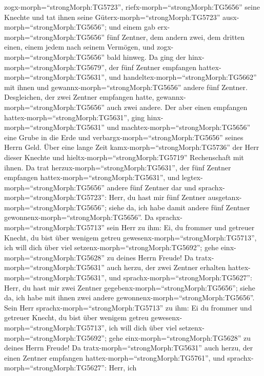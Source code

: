 zogx-morph=``strongMorph:TG5723'', riefx-morph=``strongMorph:TG5656''
seine Knechte und tat ihnen seine Güterx-morph=``strongMorph:TG5723''
ausx-morph=``strongMorph:TG5656'';  und einem gab
erx-morph=``strongMorph:TG5656'' fünf Zentner, dem andern zwei, dem
dritten einen, einem jedem nach seinem Vermögen, und
zogx-morph=``strongMorph:TG5656'' bald hinweg.  Da ging der
hinx-morph=``strongMorph:TG5679'', der fünf Zentner empfangen
hattex-morph=``strongMorph:TG5631'', und
handeltex-morph=``strongMorph:TG5662'' mit ihnen und
gewannx-morph=``strongMorph:TG5656'' andere fünf Zentner. 
Desgleichen, der zwei Zentner empfangen hatte,
gewannx-morph=``strongMorph:TG5656'' auch zwei andere.  Der
aber einen empfangen hattex-morph=``strongMorph:TG5631'', ging
hinx-morph=``strongMorph:TG5631'' und
machtex-morph=``strongMorph:TG5656'' eine Grube in die Erde und
verbargx-morph=``strongMorph:TG5656'' seines Herrn Geld. 
Über eine lange Zeit kamx-morph=``strongMorph:TG5736'' der Herr dieser
Knechte und hieltx-morph=``strongMorph:TG5719'' Rechenschaft mit ihnen.
 Da trat herzux-morph=``strongMorph:TG5631'', der fünf
Zentner empfangen hattex-morph=``strongMorph:TG5631'', und
legtex-morph=``strongMorph:TG5656'' andere fünf Zentner dar und
sprachx-morph=``strongMorph:TG5723'': Herr, du hast mir fünf Zentner
ausgetanx-morph=``strongMorph:TG5656''; siehe da, ich habe damit andere
fünf Zentner gewonnenx-morph=``strongMorph:TG5656''.  Da
sprachx-morph=``strongMorph:TG5713'' sein Herr zu ihm: Ei, du frommer
und getreuer Knecht, du bist über wenigem getreu
gewesenx-morph=``strongMorph:TG5713'', ich will dich über viel
setzenx-morph=``strongMorph:TG5692''; gehe
einx-morph=``strongMorph:TG5628'' zu deines Herrn Freude! 
Da tratx-morph=``strongMorph:TG5631'' auch herzu, der zwei Zentner
erhalten hattex-morph=``strongMorph:TG5631'', und
sprachx-morph=``strongMorph:TG5627'': Herr, du hast mir zwei Zentner
gegebenx-morph=``strongMorph:TG5656''; siehe da, ich habe mit ihnen zwei
andere gewonnenx-morph=``strongMorph:TG5656''.  Sein Herr
sprachx-morph=``strongMorph:TG5713'' zu ihm: Ei du frommer und getreuer
Knecht, du bist über wenigem getreu
gewesenx-morph=``strongMorph:TG5713'', ich will dich über viel
setzenx-morph=``strongMorph:TG5692''; gehe
einx-morph=``strongMorph:TG5628'' zu deines Herrn Freude! 
Da tratx-morph=``strongMorph:TG5631'' auch herzu, der einen Zentner
empfangen hattex-morph=``strongMorph:TG5761'', und
sprachx-morph=``strongMorph:TG5627'': Herr, ich
